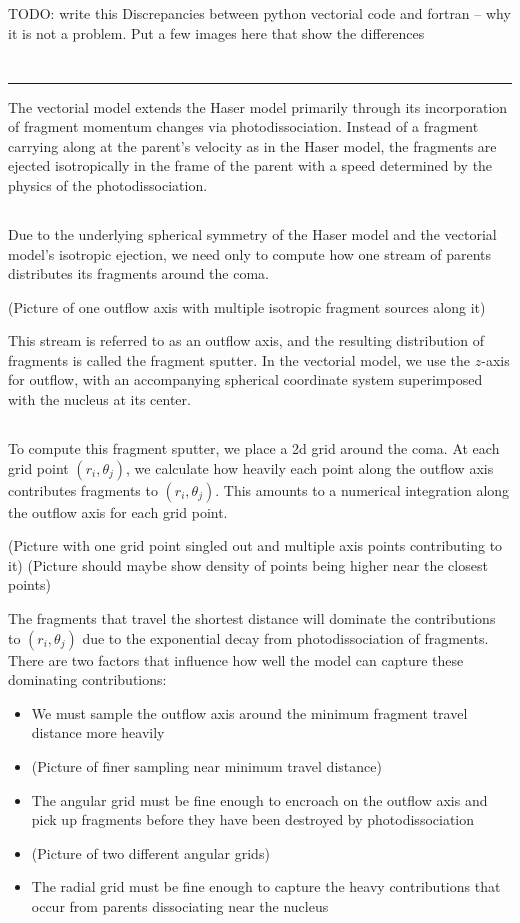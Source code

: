 \documentclass[11pt]{article}
\newcommand{\newproblem}[1]{\section*{\contour{mybblack}{\textcolor{myblack}{#1}}}}
\newcommand{\problempart}[1]{\subsection*{\contour{mybblack}{\textcolor{myblack}{#1}}}}
\begin{document}
\newpage

\newproblem{Problem Statement}
TODO: write this
Discrepancies between python vectorial code and fortran -- why it is not a problem.
Put a few images here that show the differences

\newproblem{Vectorial Model for Haser Enthusiasts}

\hrule
\vspace{5mm}

The vectorial model extends the Haser model primarily through its incorporation of fragment momentum changes via photodissociation.
Instead of a fragment carrying along at the parent's velocity as in the Haser model, the fragments are ejected isotropically in the frame of the parent with a speed determined by the physics of the photodissociation.

\problempart{Outflow Axis}
Due to the underlying spherical symmetry of the Haser model and the vectorial model's isotropic ejection, we need only to compute how one stream of parents distributes its fragments around the coma.

(Picture of one outflow axis with multiple isotropic fragment sources along it)

This stream is referred to as an outflow axis, and the resulting distribution of fragments is called the fragment sputter.
In the vectorial model, we use the \(z\)-axis for outflow, with an accompanying spherical coordinate system superimposed with the nucleus at its center.

\problempart{Fragment Sputter}
To compute this fragment sputter, we place a 2d grid around the coma.
At each grid point \((r_i, \theta_j)\), we calculate how heavily each point along the outflow axis contributes fragments to \((r_i, \theta_j)\).
This amounts to a numerical integration along the outflow axis for each grid point.

(Picture with one grid point singled out and multiple axis points contributing to it)
(Picture should maybe show density of points being higher near the closest points)

The fragments that travel the shortest distance will dominate the contributions to \((r_i, \theta_j)\) due to the exponential decay from photodissociation of fragments.
There are two factors that influence how well the model can capture these dominating contributions:
\begin{itemize}
  \item We must sample the outflow axis around the minimum fragment travel distance more heavily
  \item (Picture of finer sampling near minimum travel distance)
  \item The angular grid must be fine enough to encroach on the outflow axis and pick up fragments before they have been destroyed by photodissociation
  \item (Picture of two different angular grids)
  \item The radial grid must be fine enough to capture the heavy contributions that occur from parents dissociating near the nucleus
\end{itemize}
\end{document}
